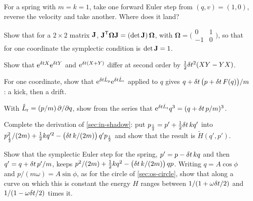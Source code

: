 \begin{exercise}
\label{ex:in-euler-reverse}
For a spring with $m = k = 1$, take one forward Euler step from $(q, v) =
(1, 0)$, reverse the velocity and take another. Where does it land?
\end{exercise}

\begin{exercise}
\label{ex:in-omega}
Show that for a $2\times2$ matrix $\bm{\mathrm{J}}$, $\bm{\mathrm{J}}^{\mathsf T}
\boldsymbol{\Omega}\bm{\mathrm{J}} = (\det\bm{\mathrm{J}})\,\boldsymbol{\Omega}$, with
$\boldsymbol{\Omega} = \bigl(\begin{smallmatrix}0 & 1\\ -1 &
0\end{smallmatrix}\bigr)$, so that for one coordinate the symplectic
condition is $\det\bm{\mathrm{J}} = 1$.
\end{exercise}

\begin{exercise}
\label{ex:in-unsymmetric}
Show that $\mathrm{e}^{\delta t X}\mathrm{e}^{\delta t Y}$ and $\mathrm{e}^{\delta t(X +
Y)}$ differ at second order by $\frac12\delta t^2(XY - YX)$.
\end{exercise}

\begin{exercise}
\label{ex:in-order}
For one coordinate, show that $\mathrm{e}^{\delta t\hat{L}_{\mathrm p}}\mathrm{e}^{
\delta t\hat{L}_{\mathrm r}}$ applied to $q$ gives $q + \delta t\,\bigl(p + \delta t\,
F(q)\bigr)/m$: a kick, then a drift.
\end{exercise}

\begin{exercise}
\label{ex:in-drift}
With $\hat{L}_{\mathrm r} = (p/m)\,\partial/\partial q$, show from the
series that $\mathrm{e}^{\delta t\hat{L}_{\mathrm r}}q^3 = (q + \delta t\,p/m)^3$.
\end{exercise}

\begin{exercise}
\label{ex:in-shadow}
Complete the derivation of \cref{sec:in-shadow}: put $p_{\frac12} = p' +
\frac12\delta t\,kq'$ into $p_{\frac12}^2/(2m) + \frac12 kq'^2 - \bigl(\delta t\,
k/(2m)\bigr)\,q'p_{\frac12}$ and show that the result is $\tilde{H}(q',
p')$.
\end{exercise}

\begin{exercise}
\label{ex:in-se-shadow}
Show that the symplectic Euler step for the spring, $p' = p - \delta t\,kq$
and then $q' = q + \delta t\,p'/m$, keeps $p^2/(2m) + \frac12 kq^2 - \bigl(\delta t
\,k/(2m)\bigr)\,qp$. Writing $q = A\cos\phi$ and $p/(m\omega) =
A\sin\phi$, as for the circle of \cref{sec:os-circle}, show that along a curve on which this is constant the
energy $H$ ranges between $1/(1 + \omega\delta t/2)$ and $1/(1 - \omega\delta t/2)$
times it.
\end{exercise}

